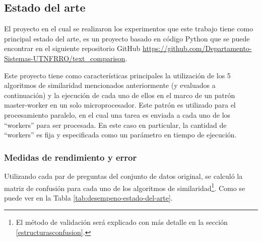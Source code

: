 \subsection{Estado del arte}
El proyecto en el cual se realizaron los experimentos que este trabajo tiene como principal estado del arte, es un proyecto basado en código Python que se puede encontrar en el siguiente repositorio GitHub \url{https://github.com/Departamento-Sistemas-UTNFRRO/text_comparison}.

\bigskip Este proyecto tiene como características principales la utilización de los 5 algoritmos de similaridad mencionados anteriormente (y evaluados a continuación) y la ejecución de cada uno de ellos en el marco de un patrón master-worker en un solo microprocesador. Este patrón es utilizado para el procesamiento paralelo, en el cual una tarea es enviada a cada uno de los “workers” para ser procesada. En este caso en particular, la cantidad de “workers” es fija y especificada como un parámetro en tiempo de ejecución.

\subsubsection{Medidas de rendimiento y error}
Utilizando cada par de preguntas del conjunto de datos original, se calculó la matriz de confusión para cada uno de los algoritmos de similaridad\footnote{El método de validación será explicado con más detalle en la sección \ref{estructurasconfusion}.}. Como se puede ver en la Tabla \ref{tab:desempeno-estado-del-arte}.


